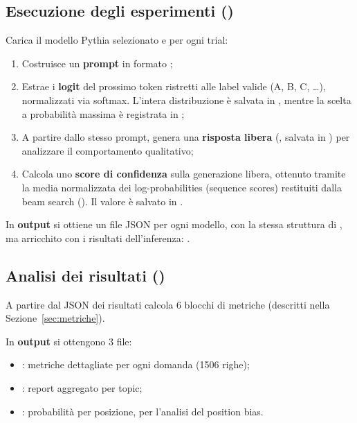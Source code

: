 \documentclass[../relazione.tex]{subfiles}
\begin{document}
\subsection{Esecuzione degli esperimenti (\protect{})}
Carica il modello Pythia selezionato e per ogni trial:
\begin{enumerate}
    \item Costruisce un \textbf{prompt} in formato ;
    \item Estrae i \textbf{logit} del prossimo token ristretti alle label valide (A, B, C, \ldots), normalizzati via softmax. L'intera distribuzione è salvata in , mentre la scelta a probabilità massima è registrata in ;
    \item A partire dallo stesso prompt, genera una \textbf{risposta libera} (, salvata in ) per analizzare il comportamento qualitativo;
    \item Calcola uno \textbf{score di confidenza} sulla generazione libera, ottenuto tramite la media normalizzata dei log-probabilities (sequence scores) restituiti dalla beam search (). Il valore è salvato in .
\end{enumerate}
In \textbf{output} si ottiene un file JSON per ogni modello, con la stessa struttura di , ma arricchito con i risultati dell'inferenza: .

\subsection{Analisi dei risultati (\protect{})}
A partire dal JSON dei risultati calcola 6 blocchi di metriche (descritti nella Sezione~\ref{sec:metriche}).

In \textbf{output} si ottengono 3 file:
\begin{itemize}
    \item {}: metriche dettagliate per ogni domanda (1506 righe);
    \item {}: report aggregato per topic;
    \item {}: probabilità per posizione, per l'analisi del position bias.
\end{itemize}
\end{document}
